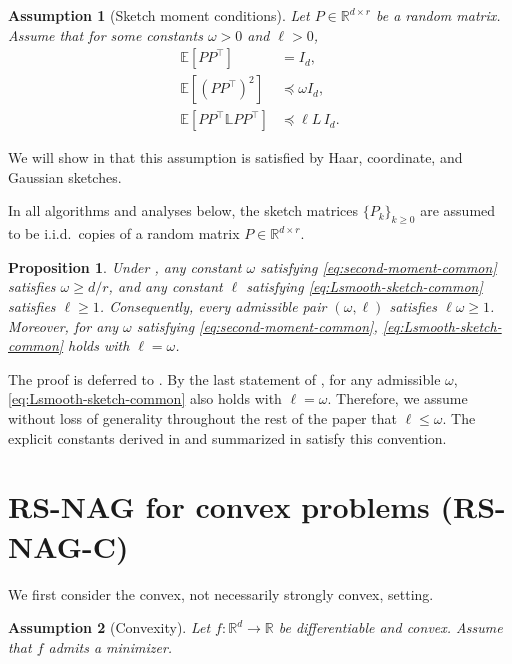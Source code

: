 \documentclass[10pt]{article}
\newtheorem{assumption}[assumption]{Assumption}
\newtheorem{proposition}[proposition]{Proposition}
\newcommand{\E}{\mathbb{E}}
\newcommand{\R}{\mathbb{R}}
\newcommand{\Lmat}{\mathbb{L}}
\begin{document}
\begin{assumption}[Sketch moment conditions]
\label{ass:sketch-common}
Let \(P\in\R^{d\times r}\) be a random matrix.
Assume that for some constants \(\omega>0\) and \(\ell>0\),
\begin{align}
\E[PP^\top] &= I_d, \label{eq:unbiased-common}\\
\E[(PP^\top)^2] &\preceq \omega I_d, \label{eq:second-moment-common}\\
\E[PP^\top \Lmat PP^\top] &\preceq \ell L\, I_d.
\label{eq:Lsmooth-sketch-common}
\end{align}
\end{assumption}
We will show in  that this assumption is satisfied by
Haar, coordinate, and Gaussian sketches.

In all algorithms and analyses below, the sketch matrices \(\{P_k\}_{k\ge0}\) are assumed to be i.i.d.\ copies of a random matrix \(P\in\R^{d\times r}\).








\begin{proposition}
\label{prop:ell-omega-redundant}
Under , any constant
\(\omega\) satisfying \eqref{eq:second-moment-common} satisfies
\(\omega\ge d/r\), and any constant \(\ell\) satisfying
\eqref{eq:Lsmooth-sketch-common} satisfies \(\ell\ge1\). Consequently, every
admissible pair \((\omega,\ell)\) satisfies \(\ell\omega\ge1\). Moreover, for
any \(\omega\) satisfying \eqref{eq:second-moment-common},
\eqref{eq:Lsmooth-sketch-common} holds with \(\ell=\omega\). 
\end{proposition}
The proof is deferred to . By the last statement
of , for any admissible \(\omega\),
\eqref{eq:Lsmooth-sketch-common} also holds with \(\ell=\omega\). Therefore,
we assume without loss of generality throughout the rest of the paper that
\(\ell\le\omega\).
The explicit constants derived in  and summarized in
 satisfy this convention.


\section{RS-NAG for convex problems (RS-NAG-C)}
\label{sec:rs-NAG-c}
We first consider the convex, not necessarily strongly convex, setting.
\begin{assumption}[Convexity]
\label{ass:func-convex}
Let \(f:\R^d\to\R\) be differentiable and convex.
Assume that \(f\) admits a minimizer.
\end{assumption}
\end{document}
